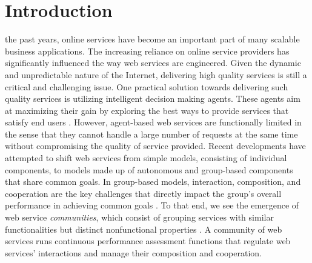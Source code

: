 \documentclass[11pt,onecolumn]{IEEEtran}
\begin{document}
\linenumbers
\maketitle

\section{Introduction}

 the past years, online services have become an important part of many scalable business applications. The increasing reliance on online service providers has significantly influenced the way web services are engineered. Given the dynamic and unpredictable nature of the Internet, delivering high quality services is still a critical and challenging issue. One practical solution towards delivering such quality services is utilizing intelligent decision making agents. These agents aim at maximizing their gain by exploring the best ways to provide services that satisfy end users \cite{Zeng:2003:QDW:775152.775211, 10.1109/ARES.2008.7, Demirkan2013412, journals/tsc/ZhengZYB13, Josang:2007:STR:1225318.1225716}. However, agent-based web services are functionally limited in the sense that they cannot handle a large number of requests at the same time without compromising the quality of service provided. Recent developments have attempted to shift web services from simple models, consisting of individual components, to models made up of autonomous and group-based components that share common goals. In group-based models, interaction, composition, and cooperation are the key challenges that directly impact the group's overall performance in achieving common goals \cite{ICWS2011-1, SCC2011-1, journals/mags/BaldoniBM10, journals/jcss/CasadoYT13}. To that end, we see the emergence of web service \emph{communities}, which consist of grouping services with similar functionalities but distinct nonfunctional properties \cite{Zeng:2003:QDW:775152.775211, 10.1109/ARES.2008.7, Paik:2005:TSS:2229263.2230038, Medjahed05adynamic}. A community of web services runs continuous performance assessment functions that regulate web services' interactions and manage their composition and cooperation.
\end{document}
